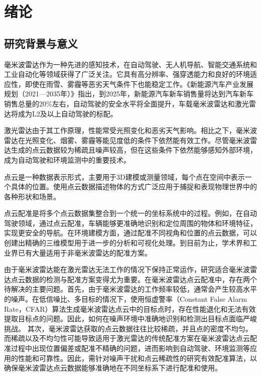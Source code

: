 \chapter{绪论}

\section{研究背景与意义}


毫米波雷达作为一种先进的感知技术，在自动驾驶、无人机导航、智能交通系统和工业自动化等领域获得了广泛关注。它具有高分辨率、强穿透能力和良好的环境适应性，即使在雨雪、雾霾等恶劣天气条件下也能稳定工作。《新能源汽车产业发展规划（2021—2035年）》\cite{xbngyrqiie2020}指出，到2025年，新能源汽车新车销售量将达到汽车新车销售总量的20\%左右，自动驾驶的安全水平将全面提升，车载毫米波雷达和激光雷达将成为L2及以上自动驾驶的标配。

激光雷达由于其工作原理，性能常受光照变化和恶劣天气影响。相比之下，毫米波雷达在光照变化、烟雾、雾霾等能见度低的条件下依然能有效工作。尽管毫米波雷达生成的点云数据较为稀疏且噪声较高，但在这些条件下依然能够感知外部环境\cite{qian20203d}，成为自动驾驶和环境监测中的重要技术。

点云是一种数据表示形式，主要用于3D建模或测量领域，每个点在空间中表示一个具体的位置。使用点云数据描述物体的方式广泛应用于捕捉和表现物理世界中的各种形状和场景。

点云配准是将多个点云数据集整合到一个统一的坐标系统中的过程。例如，在自动驾驶领域，通过点云配准，车辆能够更准确地识别和定位周围的物体和环境特征，实现更安全的导航。在环境建模方面，通过配准不同视角和位置的点云数据，可以创建出精确的三维模型用于进一步的分析和可视化处理。到目前为止，学术界和工业界已有大量适用于非毫米波雷达的配准方案。

由于毫米波雷达能在激光雷达无法工作的情况下保持正常运作，研究适合毫米波雷达点云数据的检测与配准方案变得尤为重要。在毫米波雷达点云配准中，存在两个待解决的主要问题。首先，由于毫米波雷达的工作频率较低，通常会产生较高水平的噪声。在低信噪比、多目标的情况下，使用恒虚警率（Constant False Alarm Rate，CFAR）算法\cite{7185}生成毫米波雷达点云中的目标点时，存在性能退化和无法有效提取目标点的问题。因此，如何在噪声环境中准确地识别和检测出目标点面临严峻挑战。
其次，毫米波雷达获取的点云数据往往比较稀疏，并且点的密度不均匀。而稀疏以及不均匀性可能导致适用于激光雷达的传统配准方案在毫米波雷达点云配准过程中出现位置偏差或配准不精确的问题，进而影响到自动驾驶、环境监测等应用的性能和可靠性。因此，需针对噪声干扰和点云稀疏性的研究有效配准算法，以确保毫米波雷达点云数据能够准确地在不同坐标系下进行配准和使用。

